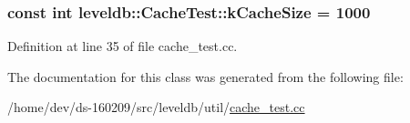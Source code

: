 \subsubsection[{k\+Cache\+Size}]{\setlength{\rightskip}{0pt plus 5cm}const int leveldb\+::\+Cache\+Test\+::k\+Cache\+Size = 1000\hspace{0.3cm}{\ttfamily [static]}}\label{classleveldb_1_1_cache_test_a101eeca736aed0fde7048d0bf21b7e0a}


Definition at line 35 of file cache\+\_\+test.\+cc.



The documentation for this class was generated from the following file\+:\begin{DoxyCompactItemize}
\item 
/home/dev/ds-\/160209/src/leveldb/util/\hyperlink{cache__test_8cc}{cache\+\_\+test.\+cc}\end{DoxyCompactItemize}
